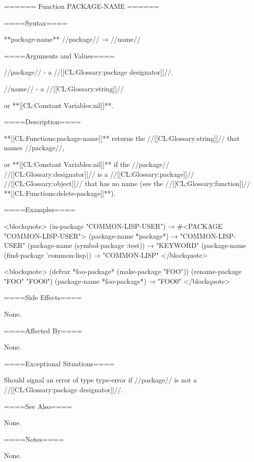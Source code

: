 ====== Function PACKAGE-NAME ======

====Syntax====

**package-name** //package// → //name//

====Arguments and Values====

//package// - a //[[CL:Glossary:package designator]]//.

//name// - a //[[CL:Glossary:string]]//

or **[[CL:Constant Variables:nil]]**.

====Description====

**[[CL:Functions:package-name]]** returns the //[[CL:Glossary:string]]// that names //package//,

or **[[CL:Constant Variables:nil]]** if the //package// //[[CL:Glossary:designator]]// is a //[[CL:Glossary:package]]// //[[CL:Glossary:object]]// that has no name (see the //[[CL:Glossary:function]]// **[[CL:Functions:delete-package]]**).

====Examples====

<blockquote> (in-package "COMMON-LISP-USER") → #<PACKAGE "COMMON-LISP-USER"> (package-name *package*) → "COMMON-LISP-USER" (package-name (symbol-package :test)) → "KEYWORD" (package-name (find-package 'common-lisp)) → "COMMON-LISP" </blockquote>

<blockquote> (defvar *foo-package* (make-package "FOO")) (rename-package "FOO" "FOO0") (package-name *foo-package*) → "FOO0" </blockquote>

====Side Effects====

None.

====Affected By====

None.

====Exceptional Situations====

Should signal an error of type type-error if //package// is not a //[[CL:Glossary:package designator]]//.

====See Also====

None.

====Notes====

None.

   
